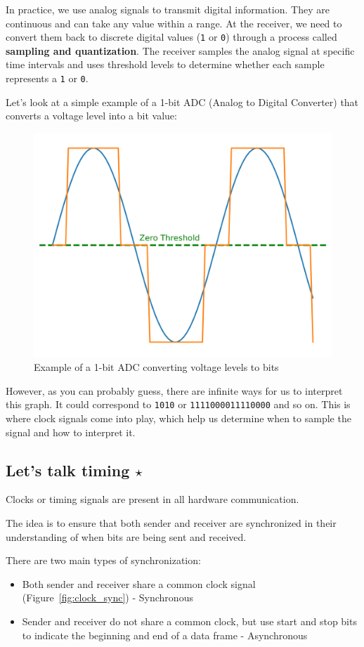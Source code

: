 In practice, we use analog signals to transmit digital information. They are continuous and can take any value within a range. At the receiver, we need to convert them back to discrete digital values (\texttt{1} or \texttt{0}) through a process called \textbf{sampling and quantization}. The receiver samples the analog signal at specific time intervals and uses threshold levels to determine whether each sample represents a \texttt{1} or \texttt{0}.

Let's look at a simple example of a 1-bit ADC (Analog to Digital Converter) that converts a voltage level into a bit value:

\begin{figure}[h]
    \centering
    \includegraphics[width=.5\textwidth]{assets/osi/physical/adc_plot.png}
    \caption{Example of a 1-bit ADC converting voltage levels to bits}\label{fig:adc_plot}
\end{figure}

However, as you can probably guess, there are infinite ways for us to interpret this graph. It could correspond to \texttt{1010} or \texttt{1111000011110000} and so on. 
This is where clock signals come into play, which help us determine when to sample the signal and how to interpret it.

\subsection*{Let's talk timing $\star$}
Clocks or timing signals are present in all hardware communication. 

The idea is to ensure that both sender and receiver are synchronized in their understanding of when bits are being sent and received. 


There are two main types of synchronization:
\begin{itemize}
    \item Both sender and receiver share a common clock signal (Figure~\ref{fig:clock_sync}) - Synchronous 
    \item Sender and receiver do not share a common clock, but use start and stop bits to indicate the beginning and end of a data frame - Asynchronous
\end{itemize}


